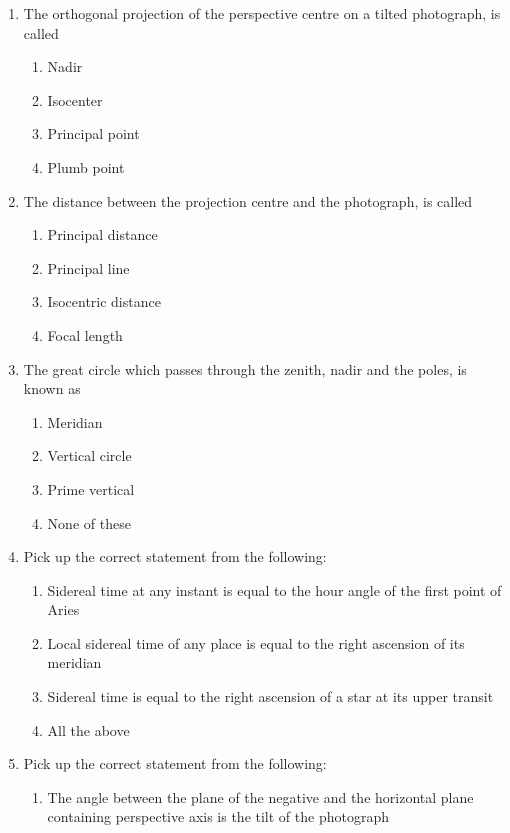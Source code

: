 \documentclass[11pt,a4paper]{article}
\begin{document}
\begin{enumerate}
\item{The orthogonal projection of the perspective centre on a tilted photograph, is called}
\begin{enumerate}[label=\Alph*.]
\item{Nadir}
\item{Isocenter}
\item{Principal point}
\item{Plumb point}
\end{enumerate}
\item{The distance between the projection centre and the photograph, is called}
\begin{enumerate}[label=\Alph*.]
\item{Principal distance}
\item{Principal line}
\item{Isocentric distance}
\item{Focal length}
\end{enumerate}
\item{The great circle which passes through the zenith, nadir and the poles, is known as}
\begin{enumerate}[label=\Alph*.]
\item{Meridian}
\item{Vertical circle}
\item{Prime vertical}
\item{None of these}
\end{enumerate}
\item{Pick up the correct statement from the following:}
\begin{enumerate}[label=\Alph*.]
\item{Sidereal time at any instant is equal to the hour angle of the first point of Aries}
\item{Local sidereal time of any place is equal to the right ascension of its meridian}
\item{Sidereal time is equal to the right ascension of a star at its upper transit}
\item{All the above}
\end{enumerate}
\item{Pick up the correct statement from the following:}
\begin{enumerate}[label=\Alph*.]
\item{The angle between the plane of the negative and the horizontal plane containing perspective axis is the tilt of the photograph}

\end{enumerate}
\end{enumerate}
\end{document}

